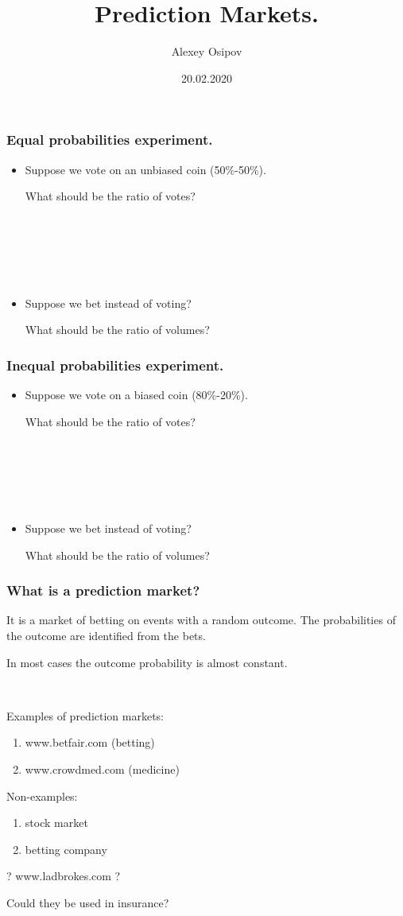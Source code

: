 \documentclass{beamer}
\title{Prediction Markets.}
\author{Alexey Osipov}
\date{20.02.2020}
\begin{document}
\maketitle
\begin{frame}[fragile]
\frametitle{Equal probabilities experiment.}
\begin{itemize}
	\item Suppose we vote on an unbiased coin (50\%-50\%).

What should be the ratio of votes?

\ 

\ 

\ 

\item Suppose we bet instead of voting?

What should be the ratio of volumes?
\end{itemize}
\end{frame}
\begin{frame}[fragile]
\frametitle{Inequal probabilities experiment.}
\begin{itemize}
	\item Suppose we vote on a biased coin (80\%-20\%).

What should be the ratio of votes?

\ 

\ 

\ 

\item Suppose we bet instead of voting?

What should be the ratio of volumes?
\end{itemize}
\end{frame}
\begin{frame}[fragile]
\frametitle{What is a prediction market?}

It is a market of betting on events with a random outcome.
The probabilities of the outcome are identified from the bets.

In most cases the outcome probability is almost constant.

\ 

Examples of prediction markets:
\begin{enumerate}
	\item www.betfair.com (betting)
	\item www.crowdmed.com (medicine)
\end{enumerate}

Non-examples:
\begin{enumerate}
	\item stock market
	\item betting company
\end{enumerate}

? www.ladbrokes.com ?
\ 

Could they be used in insurance?
\end{frame}
\end{document}
